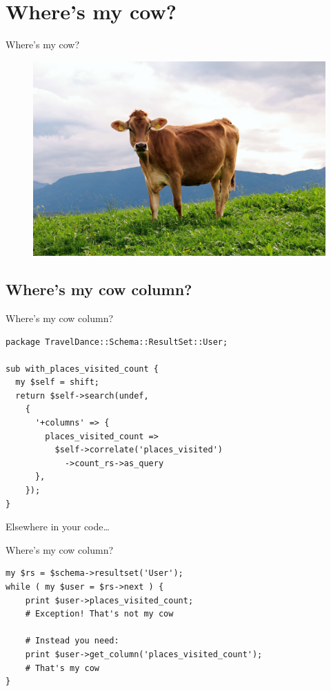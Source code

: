 \section{Where's my cow?}

\begin{frame}{Where's my cow?}
\begin{figure}[!ht]
\centering
\includegraphics[width=0.7\linewidth]{img/cow.jpg}
\end{figure}
\end{frame}

\subsection{Where's my cow column?}

\begin{frame}[fragile]{Where's my cow column?}
\begin{lstlisting}
package TravelDance::Schema::ResultSet::User;

sub with_places_visited_count {
  my $self = shift;
  return $self->search(undef,
    {
      '+columns' => {
        places_visited_count =>
          $self->correlate('places_visited')
            ->count_rs->as_query
      },
    });
}
\end{lstlisting}
\end{frame}

Elsewhere in your code…

\begin{frame}[fragile]{Where's my cow column?}
\begin{lstlisting}
my $rs = $schema->resultset('User');
while ( my $user = $rs->next ) {
    print $user->places_visited_count; 
    # Exception! That's not my cow

    # Instead you need:
    print $user->get_column('places_visited_count'); 
    # That's my cow
}
\end{lstlisting}
\end{frame}

